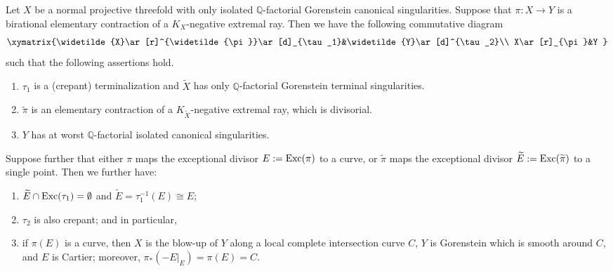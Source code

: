 \begin{lemme}\label{lem_canonical_terminal}
Let $X$ be a normal projective threefold with only isolated $\mathbb{Q}$-factorial Gorenstein canonical singularities. 
Suppose that $\pi:X\to Y$ is a birational elementary  contraction of a $K_X$-negative extremal ray.
Then we have the following commutative diagram
\[\xymatrix{\widetilde{X}\ar[r]^{\widetilde{\pi}}\ar[d]_{\tau_1}&\widetilde{Y}\ar[d]^{\tau_2}\\
X\ar[r]_{\pi}&Y
}
\]
such that the following assertions hold.
\begin{enumerate}
\item[(1)] $\tau_1$ is a (crepant) terminalization and $\widetilde{X}$ has only $\mathbb{Q}$-factorial Gorenstein terminal singularities.
\item[(2)] $\widetilde{\pi}$ is an elementary  contraction of a $K_{\widetilde{X}}$-negative extremal ray, which is   divisorial.
\item[(3)] $Y$ has at worst $\mathbb{Q}$-factorial isolated canonical singularities.
\end{enumerate}
Suppose further that either $\pi$ maps the exceptional divisor $E:=\textup{Exc}(\pi)$ to a curve, or $\widetilde{\pi}$ maps the exceptional divisor $\widetilde{E}:=\textup{Exc}(\widetilde{\pi})$ to a single point.
Then we further have:
\begin{enumerate}
\item[(4)] $\widetilde{E}\cap\textup{Exc}(\tau_1)=\emptyset$ and $\widetilde{E}=\tau_1^{-1}(E)\cong E$;
\item[(5)]  $\tau_2$ is also crepant; and in particular, 
\item[(6)] if $\pi(E)$ is a curve, then $X$ is the blow-up of $Y$ along a local complete intersection curve $C$, $Y$ is  Gorenstein which is smooth around $C$, and $E$ is  Cartier; moreover, $\pi_*(-E|_E)=\pi(E)=C$.
\end{enumerate}
\end{lemme}


